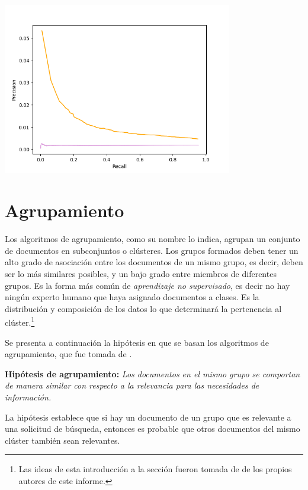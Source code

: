 \documentclass{llncs}
\begin{document}
	\begin{center}
		\includegraphics[width=10cm]{fuzzy}
	\end{center}	
	
    \section{Agrupamiento}
	
	Los algoritmos de agrupamiento, como su nombre lo indica, agrupan un conjunto de documentos en subconjuntos o clústeres. Los grupos formados deben tener un alto grado de asociación entre los documentos de un mismo grupo, es decir, deben ser lo m\'as similares posibles, y un bajo grado entre miembros de diferentes grupos. Es la forma más común de \textit{aprendizaje no supervisado}, es decir no hay ningún experto humano que haya asignado documentos a clases. Es la distribución y composición de los datos lo que determinará la pertenencia al clúster.\footnote{Las ideas de esta introducci\'on a la secci\'on fueron tomada de \cite{B6} de los propios autores de este informe.}
	
	Se presenta a continuaci\'on la hip\'otesis en que se basan los algoritmos de agrupamiento, que fue tomada de \cite[Secci\'on 16.1]{B1}.
	
	\vspace{1em}
	\textbf{Hip\'otesis de agrupamiento:} \textit{Los documentos en el mismo grupo se comportan de manera similar con respecto a la relevancia para las necesidades de información.}
	
	\vspace{0.3em}
	La hipótesis establece que si hay un documento de un grupo que es relevante a una solicitud de búsqueda, entonces es probable que otros documentos del mismo clúster también sean relevantes. 
	\vspace{1em}
	
\end{document}

